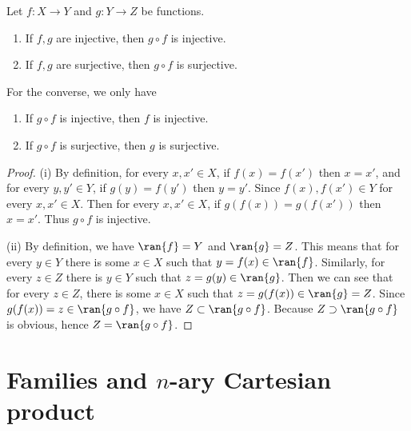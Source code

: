 \begin{lemma}
    Let $f : X \to Y$ and $g : Y \to Z$ be functions.
    \begin{enumerate}
        \item If $f, g$ are injective, then $g \circ f$ is injective.
        \item If $f, g$ are surjective, then $g \circ f$ is surjective.
    \end{enumerate}
    For the converse, we only have
    \begin{enumerate}[resume]
        \item If $g \circ f$ is injective, then $f$ is injective.
        \item If $g \circ f$ is surjective, then $g$ is surjective.
    \end{enumerate}
\end{lemma}

\begin{proof}
    (i) By definition, for every $x, x' \in X$, if $f(x) = f(x')$ then $x = x'$, and for every $y, y' \in Y$, if $g(y) = f(y')$ then $y = y'$. Since $f(x), f(x') \in Y$ for every $x, x' \in X$. Then for every $x, x' \in X$, if $g(f(x)) = g(f(x'))$ then $x = x'$. Thus $g \circ f$ is injective.

    (ii) By definition, we have $\ran{f} = Y$ and $\ran{g} = Z$. This means that for every $y \in Y$ there is some $x \in X$ such that $y = f(x) \in \ran{f}$. Similarly, for every $z \in Z$ there is $y \in Y$ such that $z = g(y) \in \ran{g}$. Then we can see that for every $z \in Z$, there is some $x \in X$ such that $z = g(f(x)) \in \ran{g} = Z$. Since $g(f(x)) = z \in \ran{g \circ f}$, we have $Z \subset \ran{g \circ f}$. Because $Z \supset \ran{g \circ f}$ is obvious, hence $Z = \ran{g \circ f}$.
\end{proof}



\section{Families and \texorpdfstring{$n$}{n}-ary Cartesian product}


\begin{definition}
    
\end{definition}




